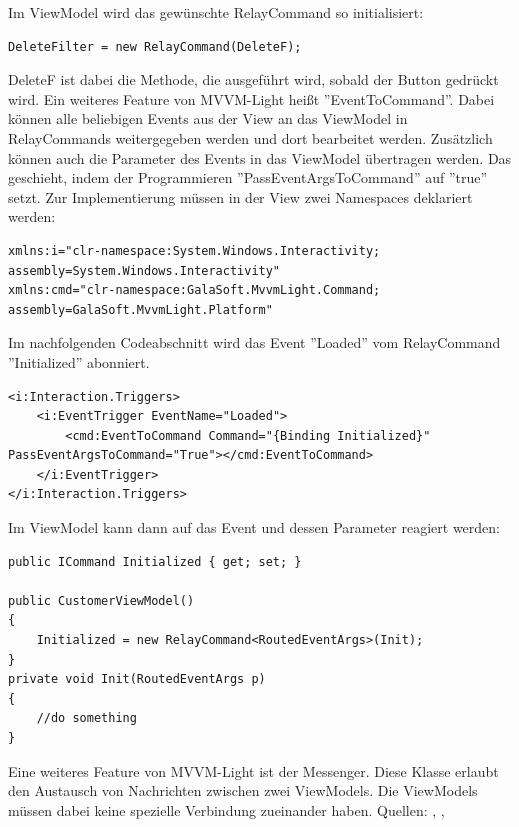 Im ViewModel wird das gewünschte RelayCommand so initialisiert:
\begin{lstlisting}
DeleteFilter = new RelayCommand(DeleteF);
\end{lstlisting}
DeleteF ist dabei die Methode, die ausgeführt wird, sobald der Button gedrückt wird.
Ein weiteres Feature von MVVM-Light heißt ''EventToCommand''. Dabei können alle beliebigen Events aus der View an das ViewModel in RelayCommands weitergegeben werden und dort bearbeitet werden. Zusätzlich können auch die Parameter des Events in das ViewModel übertragen werden. Das geschieht, indem der Programmieren ''PassEventArgsToCommand'' auf ''true'' setzt. Zur Implementierung müssen in der View zwei Namespaces deklariert werden:
\begin{lstlisting}
xmlns:i="clr-namespace:System.Windows.Interactivity;
assembly=System.Windows.Interactivity"
xmlns:cmd="clr-namespace:GalaSoft.MvvmLight.Command;
assembly=GalaSoft.MvvmLight.Platform"
\end{lstlisting}
Im nachfolgenden Codeabschnitt wird das Event ''Loaded'' vom RelayCommand ''Initialized'' abonniert.
\begin{lstlisting}
<i:Interaction.Triggers>
	<i:EventTrigger EventName="Loaded">
		<cmd:EventToCommand Command="{Binding Initialized}" PassEventArgsToCommand="True"></cmd:EventToCommand>
	</i:EventTrigger>
</i:Interaction.Triggers>
\end{lstlisting}
Im ViewModel kann dann auf das Event und dessen Parameter reagiert werden:
\begin{lstlisting}
public ICommand Initialized { get; set; }

public CustomerViewModel()
{
	Initialized = new RelayCommand<RoutedEventArgs>(Init);
}
private void Init(RoutedEventArgs p)
{
	//do something
}
\end{lstlisting}
Eine weiteres Feature von MVVM-Light ist der Messenger. Diese Klasse erlaubt den Austausch von Nachrichten zwischen zwei ViewModels. Die ViewModels müssen dabei keine spezielle Verbindung zueinander haben.
\newline Quellen: \cite{dotnetcurry_using_2018}, \cite{dotnetpattern_mvvm_2018}, \cite{microsoft_mvvm_2018}
